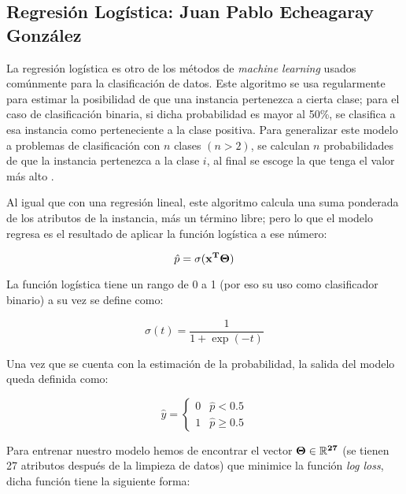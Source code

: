 \documentclass[journal]{IEEEtran}                                                          %
\begin{document}
        \subsection{Regresión Logística: Juan Pablo Echeagaray González} \label{logistic}

            La regresión logística es otro de los métodos de \emph{machine learning} usados comúnmente para la clasificación de datos. Este algoritmo se usa regularmente para estimar la posibilidad de que una instancia pertenezca a cierta clase; para el caso de clasificación binaria, si dicha probabilidad es mayor al 50\%, se clasifica a esa instancia como perteneciente a la clase positiva. Para generalizar este modelo a problemas de clasificación con $n$ clases $(n > 2)$, se calculan $n$ probabilidades de que la instancia pertenezca a la clase $i$, al final se escoge la que tenga el valor más alto \cite{geron-2019} \cite{sci-kit-learn-no-dateB}.

            Al igual que con una regresión lineal, este algoritmo calcula una suma ponderada de los atributos de la instancia, más un término libre; pero lo que el modelo regresa es el resultado de aplicar la función logística a ese número:

            \begin{equation}
                \hat{p} = \sigma(\bf{x}^{T}\bf{\Theta})
            \end{equation}

            La función logística tiene un rango de 0 a 1 (por eso su uso como clasificador binario) a su vez se define como:

            \begin{equation}
                \sigma(t) = \frac{1}{1 + \exp(-t)}
            \end{equation}

            Una vez que se cuenta con la estimación de la probabilidad, la salida del modelo queda definida como:

            \begin{equation}
                \hat{y} = \begin{cases}
                    0 & \hat{p} < 0.5 \\
                    1 & \hat{p} \geq 0.5
                \end{cases}
            \end{equation}

            Para entrenar nuestro modelo hemos de encontrar el vector $\bf{\Theta} \in \mathbb{R}^{27}$ (se tienen 27 atributos después de la limpieza de datos) que minimice la función \emph{log loss}, dicha función tiene la siguiente forma:
            
\end{document}
